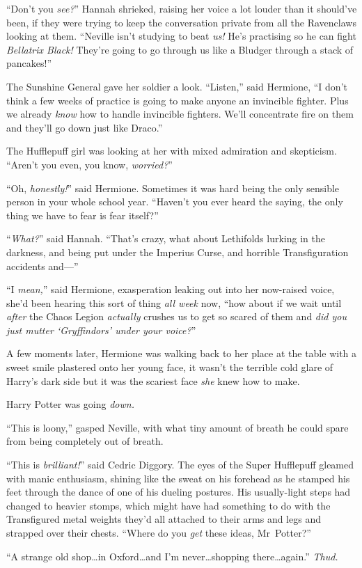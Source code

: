 “Don’t you \emph{see?}” Hannah shrieked, raising her voice a lot louder than it should’ve been, if they were trying to keep the conversation private from all the Ravenclaws looking at them. “Neville isn’t studying to beat \emph{us!} He’s practising so he can fight \emph{Bellatrix Black!} They’re going to go through us like a Bludger through a stack of pancakes!”

The Sunshine General gave her soldier a look. “Listen,” said Hermione, “I don’t think a few weeks of practice is going to make anyone an invincible fighter. Plus we already \emph{know} how to handle invincible fighters. We’ll concentrate fire on them and they’ll go down just like Draco.”

The Hufflepuff girl was looking at her with mixed admiration and skepticism. “Aren’t you even, you know, \emph{worried?}”

“Oh, \emph{honestly!}” said Hermione. Sometimes it was hard being the only sensible person in your whole school year. “Haven’t you ever heard the saying, the only thing we have to fear is fear itself?”

“\emph{What?}” said Hannah. “That’s crazy, what about Lethifolds lurking in the darkness, and being put under the Imperius Curse, and horrible Transfiguration accidents and—”

“I \emph{mean,}” said Hermione, exasperation leaking out into her now-raised voice, she’d been hearing this sort of thing \emph{all week} now, “how about if we wait until \emph{after} the Chaos Legion \emph{actually} crushes us to get so scared of them and \emph{did you just mutter ‘Gryffindors’ under your voice?}”

A few moments later, Hermione was walking back to her place at the table with a sweet smile plastered onto her young face, it wasn’t the terrible cold glare of Harry’s dark side but it was the scariest face \emph{she} knew how to make.

Harry Potter was going \emph{down.}

\later

“This is loony,” gasped Neville, with what tiny amount of breath he could spare from being completely out of breath.

“This is \emph{brilliant!}” said Cedric Diggory. The eyes of the Super Hufflepuff gleamed with manic enthusiasm, shining like the sweat on his forehead as he stamped his feet through the dance of one of his dueling postures. His usually-light steps had changed to heavier stomps, which might have had something to do with the Transfigured metal weights they’d all attached to their arms and legs and strapped over their chests. “Where do you \emph{get} these ideas, Mr~Potter?”

“A strange old shop…in Oxford…and I’m never…shopping
there…again.” \emph{Thud.}
